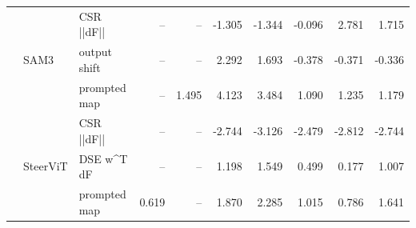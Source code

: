 \begin{tabular}{lllrrrrrrr}
\cline{2-10}
 & \multirow[t]{3}{*}{SAM3} & CSR  ||dF|| & -- & -- & -1.305 & -1.344 & -0.096 & 2.781 & 1.715 \\
 &  & output shift & -- & -- & 2.292 & 1.693 & -0.378 & -0.371 & -0.336 \\
 &  & prompted map & -- & 1.495 & 4.123 & 3.484 & 1.090 & 1.235 & 1.179 \\
\cline{2-10}
 & \multirow[t]{3}{*}{SteerViT} & CSR  ||dF|| & -- & -- & -2.744 & -3.126 & -2.479 & -2.812 & -2.744 \\
 &  & DSE  w^T dF & -- & -- & 1.198 & 1.549 & 0.499 & 0.177 & 1.007 \\
 &  & prompted map & 0.619 & -- & 1.870 & 2.285 & 1.015 & 0.786 & 1.641 \\
\cline{1-10} \cline{2-10}
\bottomrule
\end{tabular}
